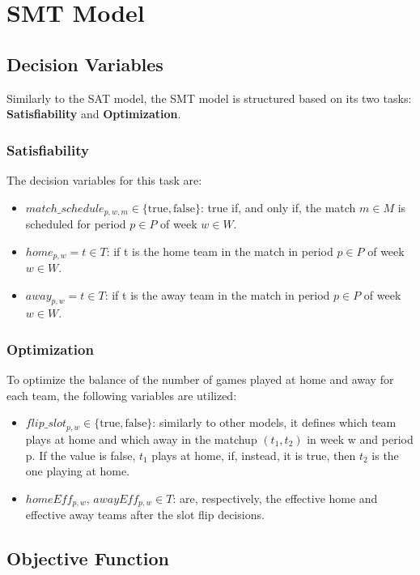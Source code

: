 \section{SMT Model}

\subsection{Decision Variables}

Similarly to the SAT model, the SMT model is structured based on its two tasks: \textbf{Satisfiability} and \textbf{Optimization}.

\subsubsection{Satisfiability}

The decision variables for this task are:
\begin{itemize}
    \item $match\_schedule_{p,w,m} \in \{\text{true}, \text{false}\}$: true if, and only if, the match $m \in M$ is scheduled for period $p \in P$ of week $w \in W$.
    \item $home_{p,w} = t \in T$: if t is the home team in the match in period $p \in P$ of week $w \in W$.
    \item $away_{p,w} = t \in T$: if t is the away team in the match in period $p \in P$ of week $w \in W$.
\end{itemize}

\subsubsection{Optimization}
To optimize the balance of the number of games played at home and away for each team, the following variables are utilized:
\begin{itemize}
    \item $flip\_slot_{p,w} \in \{\text{true}, \text{false}\}$: similarly to other models, it defines which team plays at home and which away in the matchup $(t_1, t_2)$ in week w and period p. If the value is false, $t_1$ plays at home, if, instead, it is true, then $t_2$ is the one playing at home.
    
    \item $homeEff_{p,w},\, awayEff_{p,w} \in T$: are, respectively, the effective home and effective away teams after the slot flip decisions.
\end{itemize}

\subsection{Objective Function}

